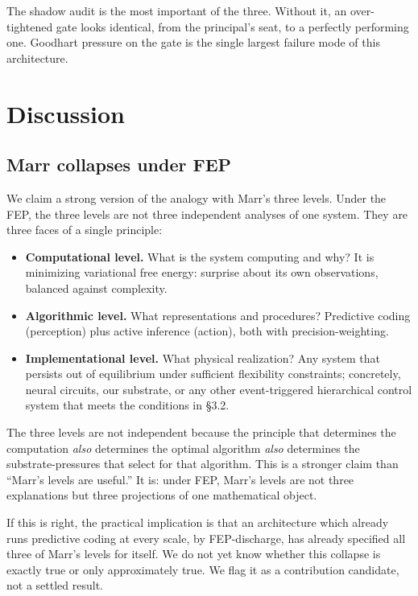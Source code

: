 \documentclass[11pt]{article}
\begin{document}
The shadow audit is the most important of the three. Without it, an over-tightened gate looks identical, from the principal's seat, to a perfectly performing one. Goodhart pressure on the gate is the single largest failure mode of this architecture.

\section{Discussion}

\subsection{Marr collapses under FEP}

We claim a strong version of the analogy with Marr's three levels. Under the FEP, the three levels are not three independent analyses of one system. They are three faces of a single principle:
\begin{itemize}[leftmargin=2em]
  \item \textbf{Computational level.} What is the system computing and why? It is minimizing variational free energy: surprise about its own observations, balanced against complexity.
  \item \textbf{Algorithmic level.} What representations and procedures? Predictive coding (perception) plus active inference (action), both with precision-weighting.
  \item \textbf{Implementational level.} What physical realization? Any system that persists out of equilibrium under sufficient flexibility constraints; concretely, neural circuits, our substrate, or any other event-triggered hierarchical control system that meets the conditions in §3.2.
\end{itemize}

The three levels are not independent because the principle that determines the computation \emph{also} determines the optimal algorithm \emph{also} determines the substrate-pressures that select for that algorithm. This is a stronger claim than ``Marr's levels are useful.'' It is: under FEP, Marr's levels are not three explanations but three projections of one mathematical object.

If this is right, the practical implication is that an architecture which already runs predictive coding at every scale, by FEP-discharge, has already specified all three of Marr's levels for itself. We do not yet know whether this collapse is exactly true or only approximately true. We flag it as a contribution candidate, not a settled result.
\end{document}
